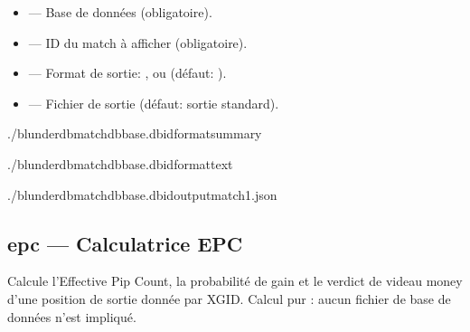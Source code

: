 \documentclass[letterpaper,10pt,french]{sphinxmanual}
\begin{document}
\sphinxAtStartPar
{}
\begin{itemize}
\item {} 
\sphinxAtStartPar
{} — Base de données (obligatoire).

\item {} 
\sphinxAtStartPar
{} — ID du match à afficher (obligatoire).

\item {} 
\sphinxAtStartPar
{} — Format de sortie: ,  ou  (défaut: ).

\item {} 
\sphinxAtStartPar
{} — Fichier de sortie (défaut: sortie standard).

\end{itemize}

\sphinxAtStartPar
{}

\begin{sphinxVerbatim}[commandchars=\\\{\}]
./blunderdbmatch\PYGZhy{}\PYGZhy{}dbbase.db\PYGZhy{}\PYGZhy{}id\PYGZhy{}\PYGZhy{}formatsummary

./blunderdbmatch\PYGZhy{}\PYGZhy{}dbbase.db\PYGZhy{}\PYGZhy{}id\PYGZhy{}\PYGZhy{}formattext

./blunderdbmatch\PYGZhy{}\PYGZhy{}dbbase.db\PYGZhy{}\PYGZhy{}id\PYGZhy{}\PYGZhy{}outputmatch1.json
\end{sphinxVerbatim}


\subsection{epc — Calculatrice EPC}
\label{\detokenize{cli:epc-calculatrice-epc}}
\sphinxAtStartPar
Calcule l’Effective Pip Count, la probabilité de gain et le verdict de videau
money d’une position de sortie donnée par XGID. Calcul pur : aucun fichier de
base de données n’est impliqué.
\end{document}
